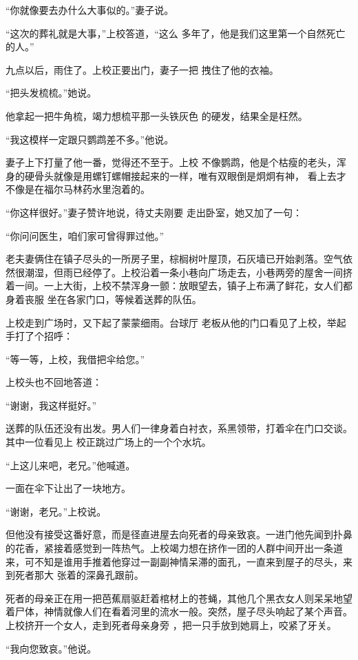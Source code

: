 \documentclass{article}
\begin{document}
“你就像要去办什么大事似的。”妻子说。 

“这次的葬礼就是大事，”上校答道，“这么
多年了，他是我们这里第一个自然死亡的人。” 

九点以后，雨住了。上校正要出门，妻子一把
拽住了他的衣袖。 


“把头发梳梳。”她说。 

他拿起一把牛角梳，竭力想梳平那一头铁灰色
的硬发，结果全是枉然。 


“我这模样一定跟只鹦鹉差不多。”他说。 

妻子上下打量了他一番，觉得还不至于。上校
\newpage
不像鹦鹉，他是个枯瘦的老头，浑身的硬骨头就像是用螺钉螺帽接起来的一样，唯有双眼倒是炯炯有神，
看上去才不像是在福尔马林药水里泡着的。 

“你这样很好。”妻子赞许地说，待丈夫刚要
走出卧室，她又加了一句： 


“你问问医生，咱们家可曾得罪过他。” 

老夫妻俩住在镇子尽头的一所房子里，棕榈树叶屋顶，石灰墙已开始剥落。空气依然很潮湿，但雨已经停了。上校沿着一条小巷向广场走去，小巷两旁的屋舍一间挤着一间。一上大街，上校不禁浑身一颤：放眼望去，镇子上布满了鲜花，女人们都身着丧服
坐在各家门口，等候着送葬的队伍。 

上校走到广场时，又下起了蒙蒙细雨。台球厅
老板从他的门口看见了上校，举起手打了个招呼： 


“等一等，上校，我借把伞给您。” 

\newpage


上校头也不回地答道： 


“谢谢，我这样挺好。” 

送葬的队伍还没有出发。男人们一律身着白衬衣，系黑领带，打着伞在门口交谈。其中一位看见上
校正跳过广场上的一个个水坑。 


“上这儿来吧，老兄。”他喊道。 


一面在伞下让出了一块地方。 


“谢谢，老兄。”上校说。 

但他没有接受这番好意，而是径直进屋去向死者的母亲致哀。一进门他先闻到扑鼻的花香，紧接着感觉到一阵热气。上校竭力想在挤作一团的人群中间开出一条道来，可不知是谁用手推着他穿过一副副神情呆滞的面孔，一直来到屋子的尽头，来到死者那大
张着的深鼻孔跟前。 

\newpage

死者的母亲正在用一把芭蕉扇驱赶着棺材上的苍蝇，其他几个黑衣女人则呆呆地望着尸体，神情就像人们在看着河里的流水一般。突然，屋子尽头响起了某个声音。上校挤开一个女人，走到死者母亲身旁
，把一只手放到她肩上，咬紧了牙关。 


“我向您致哀。”他说。 
\end{document}
